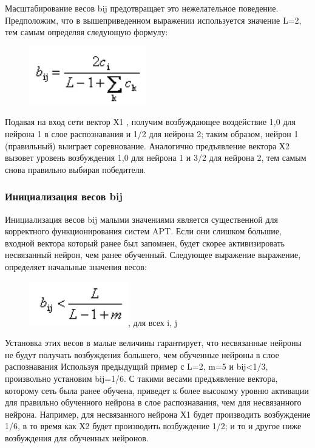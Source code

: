 \documentclass[14pt,a4paper,report]{article}
\begin{document}
Масштабирование весов bij предотвращает это нежелательное поведение. Предположим, что в вышеприведенном выражении используется значение L=2, тем самым определяя следующую формулу:

\begin{figure}[h!]
	\centering
	\includegraphics[scale = 0.90]{images/f_2.png}
\end{figure}

Подавая на вход сети вектор Х1 , получим возбуждающее воздействие 1,0 для нейрона 1 в слое распознавания и 1/2 для нейрона 2; таким образом, нейрон 1 (правильный) выиграет соревнование. Аналогично предъявление вектора Х2 вызовет уровень возбуждения 1,0 для нейрона 1 и 3/2 для нейрона 2, тем самым снова правильно выбирая победителя.

\subsubsection{Инициализация весов bij}

Инициализация весов bij малыми значениями является существенной для корректного функционирования систем APT. Если они слишком большие, входной вектора который ранее был запомнен, будет скорее активизировать несвязанный нейрон, чем ранее обученный. Следующее выражение выражение, определяет начальные значения весов:

\begin{figure}[h!]
	\centering
	\includegraphics[scale = 0.97]{images/f_3.png}, для всех i, j
\end{figure}

Установка этих весов в малые величины гарантирует, что несвязанные нейроны не будут получать возбуждения большего, чем обученные нейроны в слое распознавания \cite{cite-techn-adapt} Используя предыдущий пример с L=2, m=5 и bij<1/3, произвольно установим bij=1/6. С такими весами предъявление вектора, которому сеть была ранее обучена, приведет к более высокому уровню активации для правильно обученного нейрона в слое распознавания, чем для несвязанного нейрона. Например, для несвязанного нейрона Х1 будет производить возбуждение 1/6, в то время как Х2 будет производить возбуждение 1/2; и то и другое ниже возбуждения для обученных нейронов.
\end{document}
